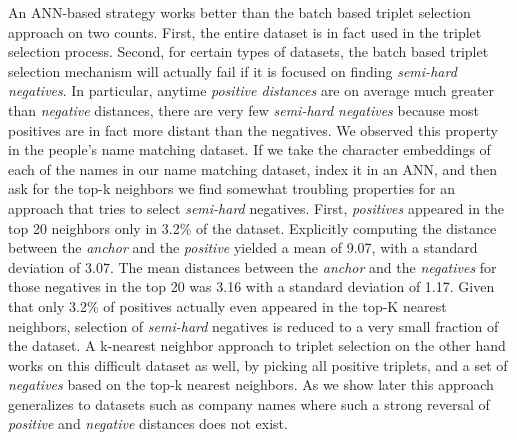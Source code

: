 An ANN-based strategy works better than the batch based triplet selection approach on two counts.  First, the entire dataset is in fact used in the triplet selection process.  Second, for certain types of datasets, the batch based triplet selection mechanism will actually fail if it is focused on finding \textit{semi-hard negatives}.  In particular, anytime \textit{positive distances} are on average much greater than \textit{negative} distances, there are very few \textit{semi-hard negatives} because most positives are in fact more distant than the negatives.  We observed this property in the people's name matching dataset.  If we take the character embeddings of each of the names in our name matching dataset, index it in an ANN, and then ask for the top-k neighbors we find somewhat troubling properties for an approach that tries to select \textit{semi-hard} negatives.  First, \textit{positives} appeared in the top 20 neighbors only in 3.2\% of the dataset.  Explicitly computing the distance between the \textit{anchor} and the \textit{positive} yielded a mean of 9.07, with a standard deviation of 3.07.  The mean distances between the \textit{anchor} and the \textit{negatives} for those negatives in the top 20 was 3.16 with a standard deviation of 1.17.  Given that only 3.2\% of positives actually even appeared in the top-K nearest neighbors, selection of \textit{semi-hard} negatives is reduced to a very small fraction of the dataset.  A k-nearest neighbor approach to triplet selection on the other hand works on this difficult dataset as well, by picking all positive triplets, and a set of \textit{negatives} based on the top-k nearest neighbors.  As we show later this approach generalizes to datasets such as company names where such a strong reversal of \textit{positive} and \textit{negative} distances does not exist.
